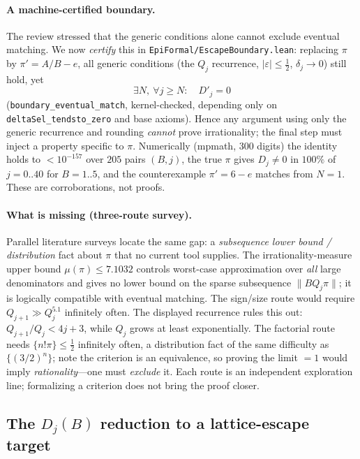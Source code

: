\documentclass[11pt]{amsart}
\theoremstyle{definition}
\theoremstyle{remark}
\numberwithin{equation}{section}
\begin{document}
\paragraph{A machine-certified boundary.} The review stressed that the generic conditions alone cannot exclude eventual matching. We now \emph{certify} this in \texttt{EpiFormal/EscapeBoundary.lean}: replacing $\pi$ by $\pi'=A/B-e$, all generic conditions (the $Q_j$ recurrence, $|\varepsilon|\le\tfrac12$, $\delta_j\to0$) still hold, yet
\[
\exists N,\ \forall j\ge N:\quad D'_j=0
\]
(\texttt{boundary\_eventual\_match}, kernel-checked, depending only on \texttt{deltaSel\_tendsto\_zero} and base axioms). Hence any argument using only the generic recurrence and rounding \emph{cannot} prove irrationality; the final step must inject a property specific to $\pi$. Numerically (mpmath, 300 digits) the identity holds to $<10^{-157}$ over $205$ pairs $(B,j)$, the true $\pi$ gives $D_j\neq0$ in $100\%$ of $j=0..40$ for $B=1..5$, and the counterexample $\pi'=6-e$ matches from $N=1$. These are corroborations, not proofs.

\paragraph{What is missing (three-route survey).} Parallel literature surveys locate the same gap: a \emph{subsequence lower bound / distribution} fact about $\pi$ that no current tool supplies. The irrationality-measure upper bound $\mu(\pi)\le7.1032$ controls worst-case approximation over \emph{all} large denominators and gives no lower bound on the sparse subsequence $\|BQ_j\pi\|$; it is logically compatible with eventual matching. The sign/size route would require $Q_{j+1}\gg Q_j^{5.1}$  infinitely often. The displayed recurrence rules this out: $Q_{j+1}/Q_j<4j+3$, while $Q_j$ grows at least exponentially. The factorial route needs $\{n!\pi\}\le\tfrac12$ infinitely often, a distribution fact of the same difficulty as $\{(3/2)^n\}$; note the criterion is an equivalence, so proving the limit $=1$ would imply \emph{rationality}---one must \emph{exclude} it. Each route is an independent exploration line; formalizing a criterion does not bring the proof closer.

\subsection{The \texorpdfstring{$D_j(B)$}{Dj(B)} reduction to a lattice-escape target}\label{sec:lean-reduction}
\end{document}
